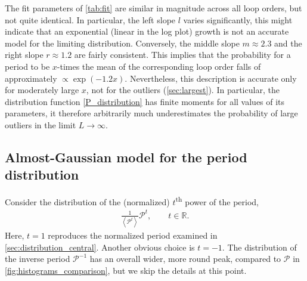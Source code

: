 \documentclass[12pt,a4paper]{article}
\newcommand{\period}{\mathcal P}
\renewcommand{\|}{\rule[-0.4ex]{0.2ex}{1.2em}}
\begin{document}
The fit parameters of \cref{tab:fit} are similar in magnitude across all loop orders, but not quite identical. In particular, the left slope $l$ varies significantly, this might indicate that an exponential (linear in the log plot) growth is not an accurate model for the limiting distribution. Conversely, the middle slope $m \approx 2.3$ and the right slope $r \approx 1.2$ are fairly consistent. This implies that the probability for a period to be $x$-times the mean of the corresponding loop order falls of approximately $\propto \exp(-1.2 x)$. Nevertheless, this description is accurate only for moderately large $x$, not for the outliers (\cref{sec:largest}). In particular, the distribution function \cref{P_distribution} has finite moments for all values of its parameters, it therefore arbitrarily much underestimates the probability of large outliers  in the limit $L\rightarrow \infty$.








\FloatBarrier


\subsection{Almost-Gaussian model for the period distribution} \label{sec:nonlinear}

Consider the distribution of the (normalized) $t$\textsuperscript{th} power of the period, 
\begin{align}\label{period_transformed}
	\frac{1}{\left \langle  \period  ^t \right \rangle  }  \period   ^t, \qquad t\in \mathbb R.
\end{align}
Here, $t=1$ reproduces the normalized period examined in \cref{sec:distribution_central}. Another obvious choice is  $t=-1$. The distribution of  the inverse period $\period^{-1}$  has an overall wider, more round peak, compared to $\period$ in \cref{fig:histograms_comparison}, but we skip the details at this point.
\end{document}
